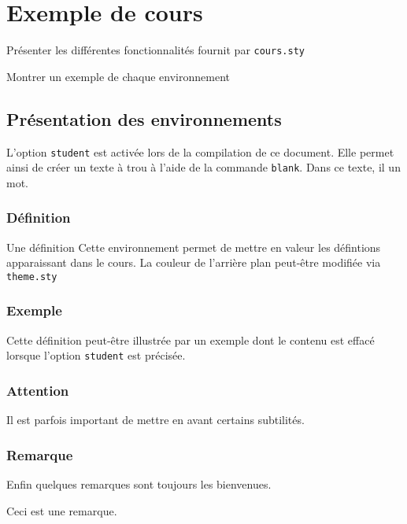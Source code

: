 \documentclass[12pt, fleqn]{book}
\begin{document}
\dominitoc
\tableofcontents
\chapter{Exemple de cours}
\begin{objectif}
	\item Présenter les différentes 
	fonctionnalités fournit par \texttt{cours.sty}
	\item Montrer un exemple de chaque environnement
\end{objectif}

\section{Présentation des environnements}
L'option \texttt{student} est activée lors de la compilation de ce document.
Elle permet ainsi de créer un texte à trou à l'aide de la commande
\texttt{blank}. Dans ce texte, il  un mot.
\subsection{Définition}
\begin{defn}{Une définition}
	Cette environnement permet de mettre en valeur les défintions 
	apparaissant dans le cours. La couleur de l'arrière plan peut-être
	modifiée via \texttt{theme.sty}
\end{defn}
\subsection{Exemple}
Cette définition peut-être illustrée par un exemple dont le contenu est effacé
lorsque l'option \texttt{student} est précisée.
\begin{exemple}
	\lipsum[1]
\end{exemple}
\subsection{Attention}
Il est parfois important de mettre en avant certains subtilités.
\begin{attention}
	\lipsum[1]
\end{attention}
\subsection{Remarque}
Enfin quelques remarques sont toujours les bienvenues.
\begin{rema}
	Ceci est une remarque.
\end{rema}
\end{document}
